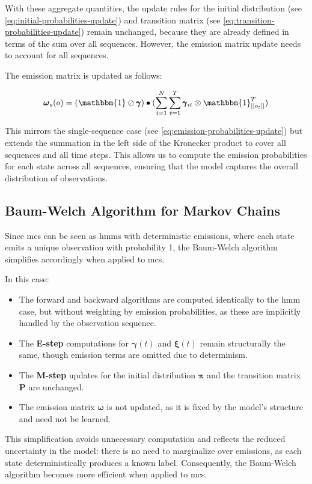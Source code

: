 With these aggregate quantities, the update rules for the initial distribution (see \autoref{eq:initial-probabilities-update}) and transition matrix (see \autoref{eq:transition-probabilities-update}) remain unchanged, because they are already defined in terms of the sum over all sequences.
However, the emission matrix update needs to account for all sequences.

The emission matrix is updated as follows:

\begin{equation}
    \pmb{\omega}
    _s(o) = (\mathbbm{1} \oslash \pmb{\gamma}) \bullet (\sum_{i=1}^N \sum_{t=1}^{T} \pmb{\gamma}_{it} \otimes \mathbbm{1}_{[[o_t]]}^{T})
    \label{eq:omega-update}
\end{equation}

This mirrors the single-sequence case (see \autoref{eq:emission-probabilities-update}) but extends the summation in the left side of the Kronecker product to cover all sequences and all time steps.
This allows us to compute the emission probabilities for each state across all sequences, ensuring that the model captures the overall distribution of observations.

\subsection{Baum-Welch Algorithm for Markov Chains}\label{subsec:baum-welch-mc}
Since \glspl{mc} can be seen as \glspl{hmm} with deterministic emissions, where each state emits a unique observation with probability 1, the Baum-Welch algorithm simplifies accordingly when applied to \glspl{mc}.

In this case:

\begin{itemize}
    \item The forward and backward algorithms are computed identically to the \gls{hmm} case, but without weighting by emission probabilities, as these are implicitly handled by the observation sequence.
    \item The \textbf{E-step} computations for $\pmb{\gamma}(t)$ and $\pmb{\xi}(t)$ remain structurally the same, though emission terms are omitted due to determinism.
    \item The \textbf{M-step} updates for the initial distribution $\pmb{\pi}$ and the transition matrix $\pmb{P}$ are unchanged.
    \item The emission matrix $\pmb{\omega}$ is not updated, as it is fixed by the model's structure and need not be learned.
\end{itemize}

This simplification avoids unnecessary computation and reflects the reduced uncertainty in the model: there is no need to marginalize over emissions, as each state deterministically produces a known label.
Consequently, the Baum-Welch algorithm becomes more efficient when applied to \glspl{mc}.
